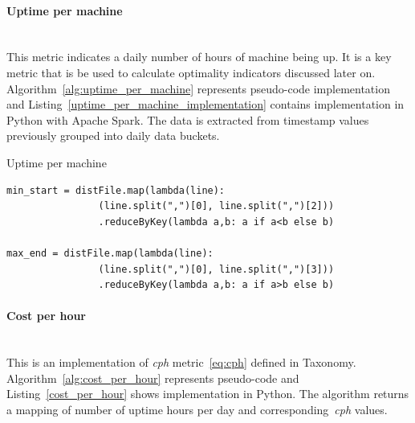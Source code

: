 \documentclass[]{final_report}
\newcommand{\myparagraph}[1]{\paragraph{#1}\mbox{}\\}
\begin{document}
\myparagraph{Uptime per machine}

This metric indicates a daily number of hours of machine being up. It is a key metric that is be used to calculate optimality indicators discussed later on. Algorithm~\ref{alg:uptime_per_machine} represents pseudo-code implementation and Listing~\ref{uptime_per_machine_implementation} contains implementation in Python with Apache Spark. The data is extracted from timestamp values previously grouped into daily data buckets.

\begin{algorithm}[h]
\caption{Uptime per machine}
\label{alg:uptime_per_machine}
 \algrenewcommand{}
 \algrenewcommand{}
\end{algorithm}

\begin{minipage}{\linewidth}
\begin{lstlisting}[label={uptime_per_machine_implementation},caption={Uptime per machine implementation in Apache Spark},frame=single] 
min_start = distFile.map(lambda(line): 
                (line.split(",")[0], line.split(",")[2]))
                .reduceByKey(lambda a,b: a if a<b else b)

max_end = distFile.map(lambda(line): 
                (line.split(",")[0], line.split(",")[3]))
                .reduceByKey(lambda a,b: a if a>b else b)
\end{lstlisting}
\end{minipage}

\myparagraph{Cost per hour}

This is an implementation of \textit{cph} metric~\ref{eq:cph} defined in Taxonomy. Algorithm~\ref{alg:cost_per_hour} represents pseudo-code and Listing~\ref{cost_per_hour} shows implementation in Python. The algorithm returns a mapping of number of uptime hours per day and corresponding~\textit{cph} values.
\end{document}
